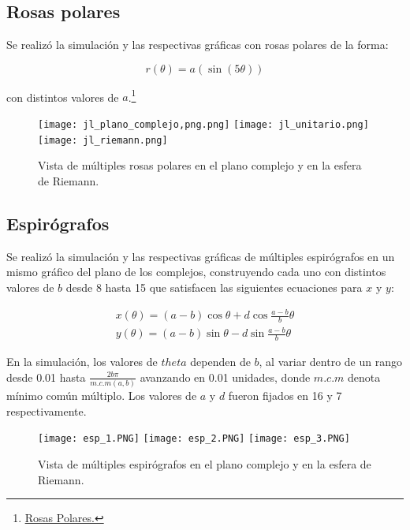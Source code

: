 \documentclass[a4paper,12pt]{article}
\begin{document}
    \newpage
    \subsection{Rosas polares}
    Se realizó la simulación y las respectivas gráficas con rosas polares de la forma:
    
    \begin{equation*}
        r(\theta) = a(\sin(5\theta))
    \end{equation*}
    
    con distintos valores de $a$.\footnote{\textcolor{blueMacc}{\underline{\href{https://es.wikipedia.org/wiki/Rosa_polar}{Rosas Polares.}}}}
    
    \begin{figure}[H]
        \centering
        \texttt{[image: jl\_plano\_complejo,png.png]}
        \texttt{[image: jl\_unitario.png]}
        \texttt{[image: jl\_riemann.png]}
        \caption{Vista de múltiples rosas polares en el plano complejo y en la esfera de Riemann.}
        \label{polares}
    \end{figure}
    
    
    
    \newpage
    \subsection{Espirógrafos}
    Se realizó la simulación y las respectivas gráficas de múltiples espirógrafos en un mismo gráfico del plano de los complejos, construyendo cada uno con distintos valores de $b$ desde 8 hasta 15 que satisfacen las siguientes ecuaciones para $x$ y $y$:
    
    \begin{align*}
        x(\theta) = (a-b)\cos \theta + d \cos \frac{a-b}{b} \theta \\
        y(\theta) = (a-b)\sin \theta - d \sin \frac{a-b}{b} \theta
    \end{align*}
    
    En la simulación, los valores de $theta$ dependen de $b$, al variar dentro de un rango desde 0.01 hasta $ \frac{2b \pi}{m.c.m(a,b)}$ avanzando en 0.01 unidades, donde $m.c.m$ denota mínimo común múltiplo. Los valores de $a$ y $d$ fueron fijados en 16 y 7 respectivamente.
    
    \begin{figure}[H]
        \centering
        \texttt{[image: esp\_1.PNG]}
        \texttt{[image: esp\_2.PNG]}
        \texttt{[image: esp\_3.PNG]}
        \caption{Vista de múltiples espirógrafos en el plano complejo y en la esfera de Riemann.}
        \label{polares}
    \end{figure}
    
\end{document}
